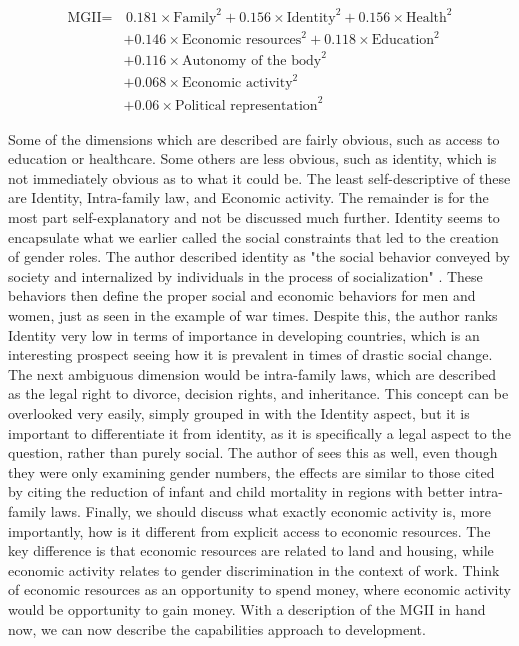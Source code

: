 \documentclass[12pt, letterpaper]{article}
\begin{document}
\begin{align*}
  \text{MGII}=
  &\,0.181\times\text{Family}^2+0.156\times\text{Identity}^2
  +0.156\times\text{Health}^2\\
  &+0.146\times\text{Economic resources}^2+0.118\times\text{Education}^2\\
  &+0.116\times\text{Autonomy of the body}^2\\
  &+0.068\times\text{Economic activity}^2\\
  &+0.06\times\text{Political representation}^2
\end{align*}

Some of the dimensions which are described are fairly obvious, such as access to education or healthcare. Some others are less obvious, such as identity, which is not immediately obvious as to what it could be. The least self-descriptive of these are Identity, Intra-family law, and Economic activity. The remainder is for the most part self-explanatory and not be discussed much further. Identity seems to encapsulate what we earlier called the social constraints that led to the creation of gender roles. The author described identity as "the social behavior conveyed by society and internalized by individuals in the process of socialization" \cite{ferrant2}. These behaviors then define the proper social and economic behaviors for men and women, just as seen in the example of war times. Despite this, the author ranks Identity very low in terms of importance in developing countries, which is an interesting prospect seeing how it is prevalent in times of drastic social change. The next ambiguous dimension would be intra-family laws, which are described as the legal right to divorce, decision rights, and inheritance. This concept can be overlooked very easily, simply grouped in with the Identity aspect, but it is important to differentiate it from identity, as it is specifically a legal aspect to the question, rather than purely social. The author of \cite{bhatt} sees this as well, even though they were only examining gender numbers, the effects are similar to those cited by \cite{ferrant2} citing the reduction of infant and child mortality in regions with better intra-family laws. Finally, we should discuss what exactly economic activity is, more importantly, how is it different from explicit access to economic resources. The key difference is that economic resources are related to land and housing, while economic activity relates to gender discrimination in the context of work. Think of economic resources as an opportunity to spend money, where economic activity would be opportunity to gain money. With a description of the MGII in hand now, we can now describe the capabilities approach to development.
\end{document}
